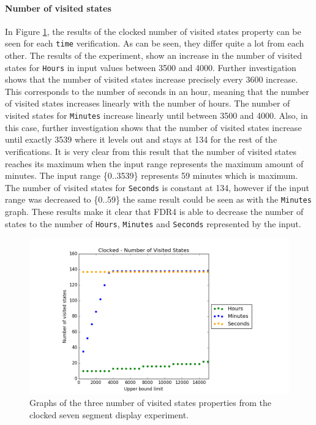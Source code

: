 \paragraph{Number of visited states}
In Figure \ref{fig:clocked_states}, the results of the clocked number of visited states property can be seen for each \texttt{time} verification. As can be seen, they differ quite a lot from each other.
The results of the experiment, show an increase in the number of visited states for \texttt{Hours} in input values between 3500 and 4000. Further investigation shows that the number of visited states increase precisely every 3600 increase.
This corresponds to the number of seconds in an hour, meaning that the number of visited states increases linearly with the number of hours.
The number of visited states for \texttt{Minutes} increase linearly until between 3500 and 4000. Also, in this case, further investigation shows that the number of visited states increase until exactly 3539 where it levels out and stays at 134 for the rest of the verifications.
It is very clear from this result that the number of visited states reaches its maximum when the input range represents the maximum amount of minutes. The input range \{0..3539\} represents 59 minutes which is maximum. The number of visited states for \texttt{Seconds} is constant at 134, however if the input range was decreased to \{0..59\} the same result could be seen as with the \texttt{Minutes} graph. These results make it clear that FDR4 is able to decrease the number of states to the number of \texttt{Hours}, \texttt{Minutes} and \texttt{Seconds} represented by the input.
\begin{figure}
    \centering
    \includegraphics[scale=0.6]{./figures/plots/clocked_states.png}
\caption{Graphs of the three number of visited states properties from the clocked seven segment display experiment.}
\label{fig:clocked_states}
\end{figure}
